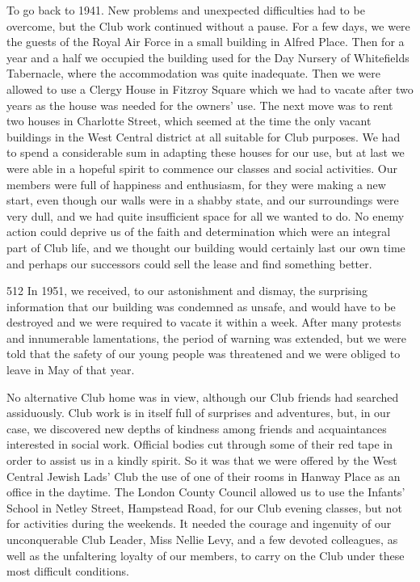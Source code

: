 To go back to 1941. New problems and unexpected
difficulties had to be overcome, but the Club work
continued without a pause. For a few days, we were the
guests of the Royal Air Force in a small building in
Alfred Place. Then for a year and a half we occupied
the building used for the Day Nursery of Whitefields
Tabernacle, where the accommodation was quite inadequate.
Then we were allowed to use a Clergy House in
Fitzroy Square which we had to vacate after two years
as the house was needed for the owners’ use. The next
move was to rent two houses in Charlotte Street, which
seemed at the time the only vacant buildings in the
West Central district at all suitable for Club purposes.
We had to spend a considerable sum in adapting these
houses for our use, but at last we were able in a hopeful
spirit to commence our classes and social activities. Our
members were full of happiness and enthusiasm, for they
were making a new start, even though our walls were in
a shabby state, and our surroundings were very dull, and
we had quite insufficient space for all we wanted to do.
No enemy action could deprive us of the faith and
determination which were an integral part of Club life,
and we thought our building would certainly last our
own time and perhaps our successors could sell the lease
and find something better.

\begin{tp}{512}
In 1951, we received, to our astonishment and dismay,
the surprising information that our building was condemned
as unsafe, and would have to be destroyed and
we were required to vacate it within a week. After many
protests and innumerable lamentations, the period
of warning was extended, but we were told that the
safety of our young people was threatened and we were
obliged to leave in May of that year.
\end{tp}

No alternative Club home was in view, although our
Club friends had searched assiduously. Club work is in
itself full of surprises and adventures, but, in our case,
we discovered new depths of kindness among friends and
acquaintances interested in social work. Official bodies
cut through some of their red tape in order to assist
us in a kindly spirit. So it was that we were offered by
the West Central Jewish Lads’ Club the use of one of
their rooms in Hanway Place as an office in the daytime.
The London County Council allowed us to use the
Infants’ School in Netley Street, Hampstead Road, for
our Club evening classes, but not for activities during
the weekends. It needed the courage and ingenuity of
our unconquerable Club Leader, Miss Nellie Levy, and
a few devoted colleagues, as well as the unfaltering
loyalty of our members, to carry on the Club under these
most difficult conditions.

